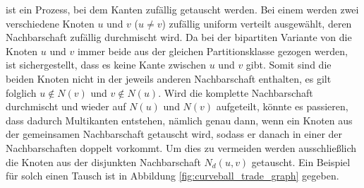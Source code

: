 \fett{\cb{}} ist  ein Prozess, bei dem Kanten zufällig getauscht werden. Bei einem \ct{} werden
zwei verschiedene Knoten $u$ und $v$ ($u\neq v$) zufällig uniform verteilt ausgewählt, deren Nachbarschaft
zufällig durchmischt wird. Da bei der bipartiten Variante  von \cb{}
die Knoten $u$ und $v$ immer beide aus der gleichen Partitionsklasse gezogen werden, ist sichergestellt, dass
es keine Kante zwischen $u$ und $v$ gibt. Somit sind die beiden Knoten nicht in der jeweils anderen Nachbarschaft
enthalten, es gilt folglich $u\notin N(v)$ und $v\notin N(u)$.
Wird die komplette Nachbarschaft  durchmischt und wieder auf $ N(u)$ und $N(v)$ 
aufgeteilt, könnte es passieren, 
dass dadurch Multikanten entstehen,  
nämlich genau dann, wenn ein Knoten aus der gemeinsamen Nachbarschaft getauscht wird, sodass er danach in 
einer der Nachbarschaften doppelt vorkommt.
Um dies zu vermeiden werden ausschließlich die Knoten aus der disjunkten Nachbarschaft $N_{d}(u,v)$ getauscht.
Ein Beispiel für solch einen Tausch ist in Abbildung \ref{fig:curveball_trade_graph} gegeben.
%
%
%
